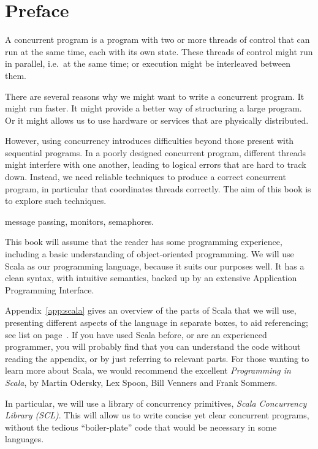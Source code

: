 \chapter*{Preface}

A concurrent program is a program with two or more threads of control that can
run at the same time, each with its own state.  These threads of control might
run in parallel, i.e.~at the same time; or execution might be interleaved
between them.

There are several reasons why we might want to write a concurrent program.  It
might run faster.  It might provide a better way of structuring a large
program.  Or it might allows us to use hardware or services that are
physically distributed.

However, using concurrency introduces difficulties beyond those present with
sequential programs.  In a poorly designed concurrent program, different
threads might interfere with one another, leading to logical errors that are
hard to track down.  Instead, we need reliable techniques to produce a correct
concurrent program, in particular that coordinates threads correctly.  The aim
of this book is to explore such techniques.

 message passing, monitors, semaphores. 

This book will assume that the reader has some programming experience,
including a basic understanding of object-oriented programming.  We will use
Scala as our programming language, because it suits our purposes well.  It has
a clean syntax, with intuitive semantics, backed up by an extensive
Application Programming Interface.

Appendix~\ref{app:scala} gives an overview of the parts of Scala that we will
use, presenting different aspects of the language in separate boxes, to aid
referencing; see list on page~\pageref{listofsib}.
%
If you have used Scala before, or are an experienced programmer, you will
probably find that you can understand the code without reading the appendix,
or by just referring to relevant parts.  
%
For those wanting to learn more about
Scala, we would recommend the excellent \emph{Programming in Scala}, by Martin
Odersky, Lex Spoon, Bill Venners and Frank Sommers.

In particular, we will use a library of concurrency primitives, \emph{Scala
  Concurrency Library (SCL)}.  This will allow us to write concise yet clear
concurrent programs, without the  tedious ``boiler-plate'' code that would be
necessary in some languages.  

